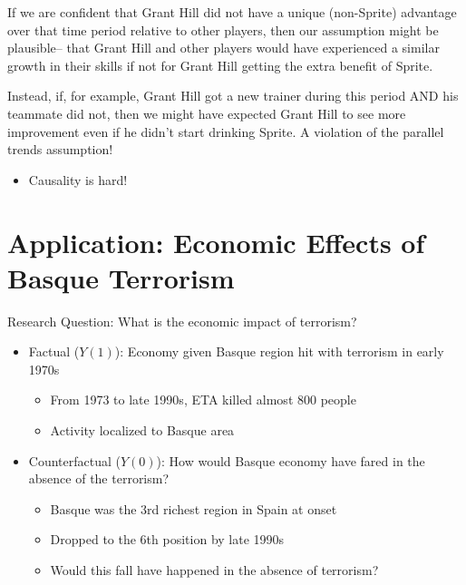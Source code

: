 \documentclass[
  letterpaper,
  DIV=11,
  numbers=noendperiod]{scrreprt}
\providecommand{\tightlist}{%
  \setlength{\itemsep}{0pt}\setlength{\parskip}{0pt}}\usepackage{longtable,booktabs,array}
\begin{document}
If we are confident that Grant Hill did not have a unique (non-Sprite)
advantage over that time period relative to other players, then our
assumption might be plausible-- that Grant Hill and other players would
have experienced a similar growth in their skills if not for Grant Hill
getting the extra benefit of Sprite.

Instead, if, for example, Grant Hill got a new trainer during this
period AND his teammate did not, then we might have expected Grant Hill
to see more improvement even if he didn't start drinking Sprite. A
violation of the parallel trends assumption!

\begin{itemize}
\tightlist
\item
  Causality is hard!
\end{itemize}

\hypertarget{application-economic-effects-of-basque-terrorism}{%
\section{Application: Economic Effects of Basque
Terrorism}\label{application-economic-effects-of-basque-terrorism}}

Research Question: What is the economic impact of terrorism?

\begin{itemize}
\tightlist
\item
  Factual (\(Y(1)\)): Economy given Basque region hit with terrorism in
  early 1970s

  \begin{itemize}
  \tightlist
  \item
    From 1973 to late 1990s, ETA killed almost 800 people
  \item
    Activity localized to Basque area
  \end{itemize}
\item
  Counterfactual (\(Y(0)\)): How would Basque economy have fared in the
  absence of the terrorism?

  \begin{itemize}
  \tightlist
  \item
    Basque was the 3rd richest region in Spain at onset
  \item
    Dropped to the 6th position by late 1990s
  \item
    Would this fall have happened in the absence of terrorism?
  \end{itemize}
\end{itemize}
\end{document}
